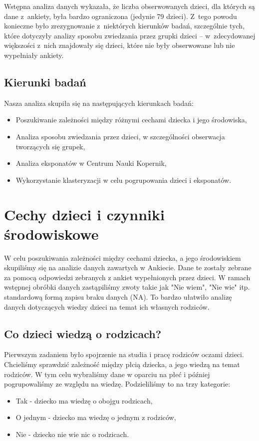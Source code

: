 \documentclass[conference]{IEEEtran}
\begin{document}
Wstępna analiza danych wykazała, że liczba obserwowanych dzieci, dla których są dane z~ankiety, była bardzo ograniczona (jedynie 79 dzieci). Z~tego powodu konieczne było zrezygnowanie z~niektórych kierunków badań, szczególnie tych, które dotyczyły analizy sposobu zwiedzania przez grupki dzieci -- w~zdecydowanej większości z~nich znajdowały się dzieci, które nie były obserwowane lub nie wypełniały ankiety.
\subsection{Kierunki badań}
Nasza analiza skupiła się na następujących kierunkach badań:
\begin{itemize}
\item Poszukiwanie zależności między różnymi cechami dziecka i jego środowiska,
\item Analiza sposobu zwiedzania przez dzieci, w szczególności obserwacja tworzących się grupek,
\item Analiza eksponatów w Centrum Nauki Kopernik,
\item Wykorzystanie klasteryzacji w celu pogrupowania dzieci i eksponatów.
\end{itemize}

\section{Cechy dzieci i czynniki środowiskowe}
W celu poszukiwania zależności między cechami dziecka, a jego środowiskiem skupiliśmy się na analizie danych zawartych w Ankiecie. Dane te zostały zebrane za pomocą odpowiedzi zebranych z ankiet wypełnionych przez dzieci. W ramach wstępnej obróbki danych zastąpiliśmy zwoty takie jak "Nie wiem", "Nie wie" itp. standardową formą zapisu braku danych (NA). To bardzo ułatwiło analizę danych dotyczących wiedzy dzieci na temat ich własnych rodziców.

\subsection{Co dzieci wiedzą o rodzicach?}
Pierwszym zadaniem było spojrzenie na studia i pracę rodziców oczami dzieci. Chcieliśmy sprawdzić zależność między płcią dziecka, a jego wiedzą na temat rodziców. W tym celu wybraliśmy dane w oparciu na płeć i później pogrupowaliśmy ze względu na wiedzę. Podzieliliśmy to na trzy kategorie:

\begin{itemize}
	\item Tak - dziecko ma wiedzę o obojgu rodzicach,
	\item O jednym - dziecko ma wiedzę o jednym z rodziców,
	\item Nie - dziecko nie wie nic o rodzicach.
\end{itemize}
\end{document}
